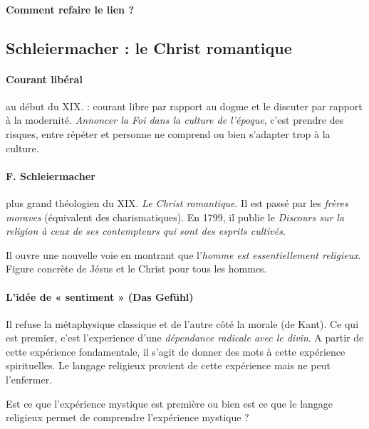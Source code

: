 \paragraph{Comment refaire le lien ? }


\subsection{Schleiermacher : le Christ romantique}  

\paragraph{Courant libéral } au début du XIX. : courant libre par rapport au dogme et le discuter par rapport à la modernité. \textit{Annoncer la Foi dans la culture de l'époque}, c'est prendre des risques, entre répéter et personne ne comprend ou bien s'adapter trop à la culture.

\paragraph{F. Schleiermacher} plus grand théologien du XIX. \textit{Le Christ romantique}. Il est passé par les \textit{frères moraves} (équivalent des charismatiques). En 1799,  il publie le \textit{Discours sur la religion à ceux de ses contempteurs qui sont des esprits cultivés}.

Il ouvre une nouvelle voie en montrant que l'\textit{homme est essentiellement religieux}. Figure concrète de Jésus et le Christ pour tous les hommes.

\paragraph{L’idée de « sentiment » (Das Gefühl)} Il refuse la métaphysique classique et de l'autre côté la morale (de Kant). Ce qui est premier, c'est l'experience d'une \textit{dépendance radicale avec le divin}. A partir de cette expérience fondamentale, il s'agit de donner des mots à cette expérience spirituelles. Le langage religieux provient de cette expérience mais ne peut l'enfermer.

\begin{Prop}
Est ce que l'expérience mystique est première ou bien est ce que le langage religieux permet de comprendre l'expérience mystique ? 
\end{Prop}

